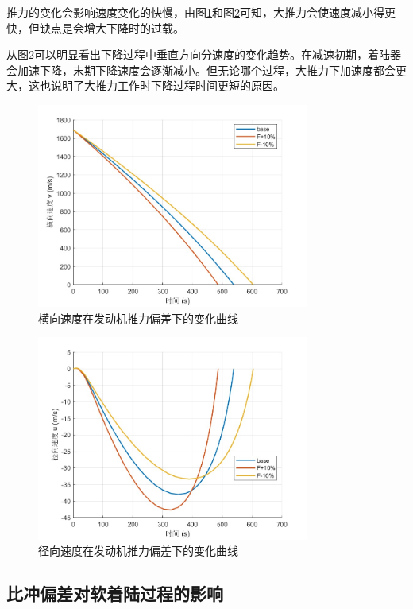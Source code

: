 \documentclass[12pt,a4paper]{article}
\begin{document}
推力的变化会影响速度变化的快慢，由图\ref{fig:vF}和图\ref{fig:uF}可知，大推力会使速度减小得更快，但缺点是会增大下降时的过载。

从图\ref{fig:uF}可以明显看出下降过程中垂直方向分速度的变化趋势。在减速初期，着陆器会加速下降，末期下降速度会逐渐减小。但无论哪个过程，大推力下加速度都会更大，这也说明了大推力工作时下降过程时间更短的原因。

\begin{figure}[H]
\centering
\includegraphics[width=0.8\textwidth]{figures/v_F.jpg}
\caption{横向速度在发动机推力偏差下的变化曲线}
\label{fig:vF}
\end{figure}

\begin{figure}[H]
\centering
\includegraphics[width=0.8\textwidth]{figures/u_F.jpg}
\caption{径向速度在发动机推力偏差下的变化曲线}
\label{fig:uF}
\end{figure}

\subsection{比冲偏差对软着陆过程的影响}
\end{document}
